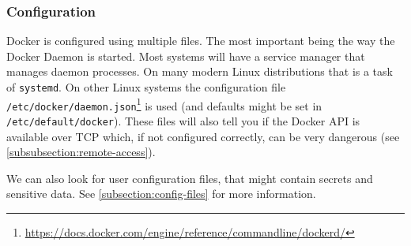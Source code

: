 \subsubsection{Configuration}
Docker is configured using multiple files. The most important being the way the Docker Daemon is started. Most systems will have a service manager that manages daemon processes. On many modern Linux distributions that is a task of \lstinline{systemd}. On other Linux systems the configuration file \lstinline{/etc/docker/daemon.json}\footnote{\url{https://docs.docker.com/engine/reference/commandline/dockerd/}} is used (and defaults might be set in \lstinline{/etc/default/docker}). These files will also tell you if the Docker API is available over TCP which, if not configured correctly, can be very dangerous (see \autoref{subsubsection:remote-access}).

\hfill

We can also look for user configuration files, that might contain secrets and sensitive data. See \autoref{subsection:config-files} for more information.
